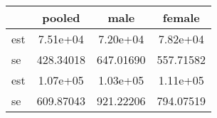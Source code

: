 \begin{table}[htbp]
\begin{tabular}{lccc} \hline \hline
 & pooled  & male  & female  \\  \hline 
est &  7.51e+04 &  7.20e+04 &  7.82e+04 \\  
se & 428.34018 & 647.01690 & 557.71582 \\  
est &  1.07e+05 &  1.03e+05 &  1.11e+05 \\  
se & 609.87043 & 921.22206 & 794.07519 \\  
\hline \hline \end{tabular}
\end{table}
